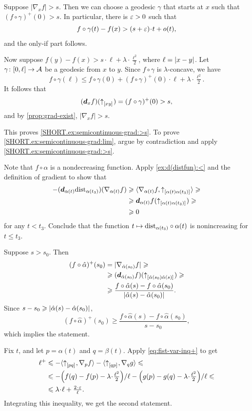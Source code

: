 Suppose $|\nabla_xf|> s$.
Then we can choose a geodesic $\gamma$ that starts at $x$ such that 
$(f\circ\gamma)^+(0)>s$.
In particular, there is $\varepsilon>0$ such that
\[f\circ\gamma(t)-f(x)>(s+\eps)\cdot t+o(t),\]
and the only-if part follows.

Now suppose $f(y)-f(x)>s\cdot \ell+\lambda\cdot \tfrac{\ell^2}2$,
where $\ell=\dist{x}{y}{}$.
Let $\gamma\colon[0,\ell]\to \mathcal{A}$ be a geodesic from $x$ to $y$.
Since $f\circ\gamma$ is $\lambda$-concave, we have
\[f\circ\gamma(\ell)\le f\circ\gamma(0)+(f\circ\gamma)^+(0)\cdot\ell+\lambda\cdot \tfrac{\ell^2}2.\]
It follows that 
\[(\bm{d}_xf)({\uparrow}_{[{x}{y}]_{{}}})=(f\circ\gamma)^+(0)>s,\]
and by \ref{prop:grad-exist}, $|\nabla_x f|>s$.

This proves \ref{SHORT.ex:semicontinuous-grad:>s}.
To prove \ref{SHORT.ex:semicontinuous-grad:lim}, argue by contradiction and apply \ref{SHORT.ex:semicontinuous-grad:>s}.

Note that $f\circ\alpha$ is a nondecreasing function.
Apply \ref{ex:d(distfun):<} and the definition of gradient to show that
\begin{align*}
-(\bm{d}_{\alpha(t)}\mathrm{dist}_{\alpha(t_3)})(\nabla_{\alpha(t)}f)
&\geqslant
\langle \nabla_{\alpha(t)}f,{\uparrow}_{[{\alpha(t)}{\alpha(t_3)}]_{{}}}\rangle
\geqslant
\\
&\geqslant
\bm{d}_{\alpha(t)}f({\uparrow}_{[{\alpha(t)}{\alpha(t_3)}]_{{}}})\geqslant
\\&\geqslant0
\end{align*}
for any $t<t_3$.
Conclude that the function $t\mapsto \mathrm{dist}_{\alpha(t_3)}\circ\alpha(t)$ is nonincreasing for $t\le t_3$.

Suppose $s>s_0$.
Then
\begin{align*}
(f\circ\hat\alpha)^+(s_0)&=|\nabla_{\hat\alpha(s_0)}f|
\ge
\\
&\ge
(\dd_{\hat\alpha(s_0)}f)(\dir{\hat\alpha(s_0)}{\hat\alpha(s)})
\ge
\\
&\ge
\frac{f\circ\hat\alpha(s)-f\circ\hat\alpha(s_0)}{\dist{\hat\alpha(s)}{\hat\alpha(s_0)}{}}.
\end{align*} 
Since $s-s_0\ge\dist{\hat\alpha(s)}{\hat\alpha(s_0)}{}$,
\[(f\circ\hat\alpha)^+(s_0)\ge
\frac{f\circ\hat\alpha(s)-f\circ\hat\alpha(s_0)}{s-s_0},\]
which implies the statement.

Fix $t$, and let $p=\alpha(t)$ and $q=\beta(t)$.
Apply \ref{eq:fist-var-inq+} to get
\begin{align*}
\ell^+&\le -\<\dir{p}{q},\nabla_{p}f\>
-\<\dir{q}{p},\nabla_{q}g\>
\le
\\&\le -{\left({f(q)}-{f(p)}-\lambda\cdot\tfrac{\ell^2}2\right)}/{\ell}
-{\left({g(p)}-{g(q)}-\lambda\cdot\tfrac{\ell^2}2\right)}/{\ell}\le
\\&\le \lambda\cdot\ell+\tfrac{2\cdot\eps}{\ell}.
\end{align*}
Integrating this inequality, we get the second statement.

